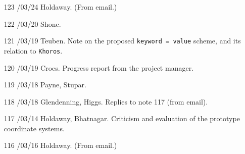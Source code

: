 \begin{enumerate}
\item[123]
/03/24 Holdaway.
\linebreak  (From email.)

\item[122]
/03/20 Shone.

\item[121]
/03/19 Teuben.
\linebreak  Note on the proposed \texttt{keyword = value} scheme, and its relation
   to \texttt{Khoros}.

\item[120]
/03/19 Croes.
\linebreak  Progress report from the project manager.

\item[119]
/03/18 Payne, Stupar.

\item[118]
/03/18 Glendenning, Higgs.
\linebreak  Replies to note 117 (from email).

\item[117]
/03/14 Holdaway, Bhatnagar.
\linebreak  Criticism and evaluation of the prototype coordinate systems.

\item[116]
/03/16 Holdaway.
\linebreak  (From email.)


\end{enumerate}
